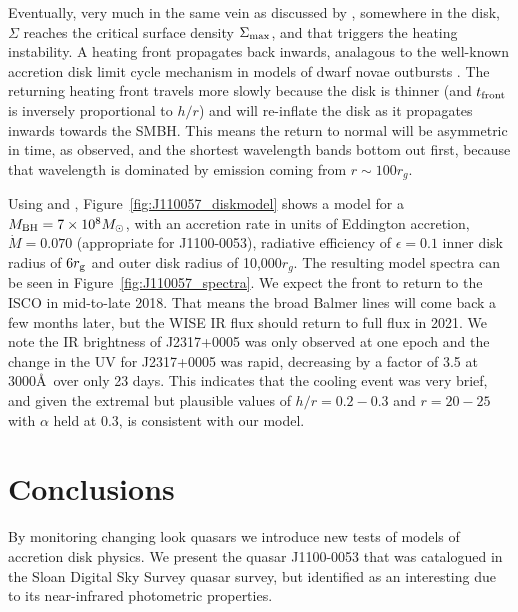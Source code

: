 \documentclass[a4paper,fleqn,usenatbib]{mnras}
\begin{document}
Eventually, very much in the same vein as discussed by
\citet{Hameury2009}, somewhere in the disk, $\Sigma$ reaches the
critical surface density $\Sigma_{\rm max}$, and that triggers the
heating instability. A heating front propagates back inwards,
analagous to the well-known accretion disk limit cycle mechanism in
models of dwarf novae outbursts \citep[e.g.,][]{Cannizzo1998}. The
returning heating front travels more slowly because the disk is
thinner (and $t_{\rm front}$ is inversely proportional to $h/r$) and
will re-inflate the disk as it propagates inwards towards the
SMBH. This means the return to normal will be asymmetric in time, as
observed, and the shortest wavelength bands bottom out first, because
that wavelength is dominated by emission coming from $r\sim100r_{g}$.

Using \citet{Ford2018} and \citet{Sirko_Goodman2003},
Figure~\ref{fig:J110057_diskmodel} shows a model for a $M_{\rm
BH}=7\times 10^{8} M_{\odot}$, with an accretion rate in units of
Eddington accretion, $\dot{M}=0.070$ (appropriate for J1100-0053),
radiative efficiency of $\epsilon=0.1$ inner disk radius of $6r_{\rm
g}$ and outer disk radius of 10,000$r_{g}$. The resulting model
spectra can be seen in Figure~\ref{fig:J110057_spectra}. We expect the
front to return to the ISCO in mid-to-late 2018. That means the broad
Balmer lines will come back a few months later, but the WISE IR flux
should return to full flux in 2021. We note the IR brightness of
J2317+0005 was only observed at one epoch and the change in the UV for
J2317+0005 was rapid, decreasing by a factor of 3.5 at 3000\AA\ over
only 23 days. This indicates that the cooling event was very brief,
and given the extremal but plausible values of $h/r = 0.2-0.3$ and
$r=20-25$ with $\alpha$ held at 0.3, is consistent with our model.



\section{Conclusions} 
By monitoring changing look quasars we introduce new
tests of models of accretion disk physics. We present the 
quasar J1100-0053 that was catalogued in the Sloan Digital 
Sky Survey quasar survey, but identified as an interesting due 
to its near-infrared photometric properties. 
\end{document}
